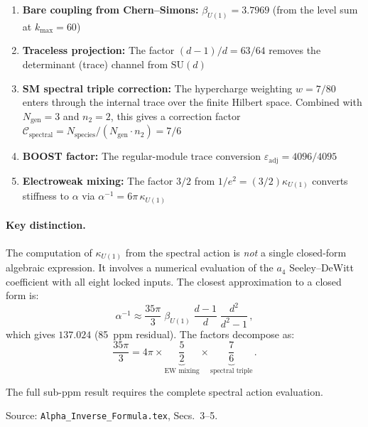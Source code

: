 \documentclass[12pt,a4paper]{article}
\begin{document}
\begin{enumerate}
\item \textbf{Bare coupling from Chern--Simons:}
  $\beta_{U(1)} = 3.7969$ (from the level sum at $k_{\max} = 60$)

\item \textbf{Traceless projection:} The factor $(d-1)/d = 63/64$
  removes the determinant (trace) channel from $\mathrm{SU}(d)$

\item \textbf{SM spectral triple correction:} The hypercharge weighting
  $w = 7/80$ enters through the internal trace over the finite
  Hilbert space. Combined with $N_{\mathrm{gen}} = 3$ and $n_2 = 2$,
  this gives a correction factor
  $\mathcal{C}_{\mathrm{spectral}} = N_{\mathrm{species}}/(N_{\mathrm{gen}} \cdot n_2) = 7/6$

\item \textbf{BOOST factor:} The regular-module trace conversion
  $\varepsilon_{\mathrm{adj}} = 4096/4095$

\item \textbf{Electroweak mixing:} The factor $3/2$ from
  $1/e^2 = (3/2)\kappa_{U(1)}$ converts stiffness to $\alpha$
  via $\alpha^{-1} = 6\pi\,\kappa_{U(1)}$
\end{enumerate}

\paragraph{Key distinction.}
The computation of $\kappa_{U(1)}$ from the spectral action is
\emph{not} a single closed-form algebraic expression. It involves a
numerical evaluation of the $a_4$ Seeley--DeWitt coefficient with
all eight locked inputs. The closest approximation to a closed form
is:
\begin{equation}
\alpha^{-1} \approx \frac{35\pi}{3}\;\beta_{U(1)}\;\frac{d-1}{d}
\;\frac{d^2}{d^2-1}\,,
\end{equation}
which gives $137.024$ (85~ppm residual). The factors decompose as:
\begin{equation}
\frac{35\pi}{3} = 4\pi \times \underbrace{\frac{5}{2}}_{\text{EW mixing}}
\times \underbrace{\frac{7}{6}}_{\text{spectral triple}}\,.
\end{equation}

The full sub-ppm result requires the complete spectral action
evaluation.

Source: \texttt{Alpha\_Inverse\_Formula.tex}, Secs.~3--5.

\end{document}
